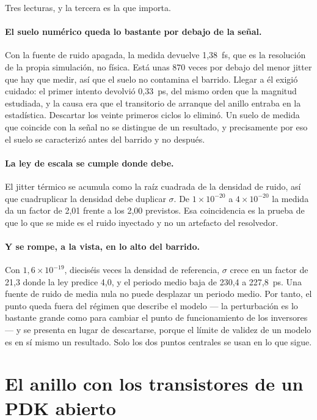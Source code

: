 Tres lecturas, y la tercera es la que importa.

\paragraph{El suelo numérico queda lo bastante por debajo de la señal.} Con
la fuente de ruido apagada, la medida devuelve 1,38~fs, que es la
resolución de la propia simulación, no física. Está unas 870 veces por
debajo del menor jitter que hay que medir, así que el suelo no contamina
el barrido. Llegar a él exigió cuidado: el primer intento devolvió
0,33~ps, del mismo orden que la magnitud estudiada, y la causa era que el
transitorio de arranque del anillo entraba en la estadística. Descartar
los veinte primeros ciclos lo eliminó. Un suelo de medida que coincide con
la señal no se distingue de un resultado, y precisamente por eso el suelo
se caracterizó antes del barrido y no después.

\paragraph{La ley de escala se cumple donde debe.} El jitter térmico se
acumula como la raíz cuadrada de la densidad de ruido, así que cuadruplicar
la densidad debe duplicar $\sigma$. De $1\times10^{-20}$ a
$4\times10^{-20}$ la medida da un factor de 2,01 frente a los 2,00
previstos. Esa coincidencia es la prueba de que lo que se mide es el ruido
inyectado y no un artefacto del resolvedor.

\paragraph{Y se rompe, a la vista, en lo alto del barrido.} Con
$1{,}6\times10^{-19}$, dieciséis veces la densidad de referencia, $\sigma$
crece en un factor de 21,3 donde la ley predice 4,0, y el periodo medio
baja de 230,4 a 227,8~ps. Una fuente de ruido de media nula no puede
desplazar un periodo medio. Por tanto, el punto queda fuera del régimen
que describe el modelo --- la perturbación es lo bastante grande como para
cambiar el punto de funcionamiento de los inversores --- y se presenta en
lugar de descartarse, porque el límite de validez de un modelo es en sí
mismo un resultado. Solo los dos puntos centrales se usan en lo que sigue.

\section{El anillo con los transistores de un PDK abierto}
\label{sec:ihp_ring}

